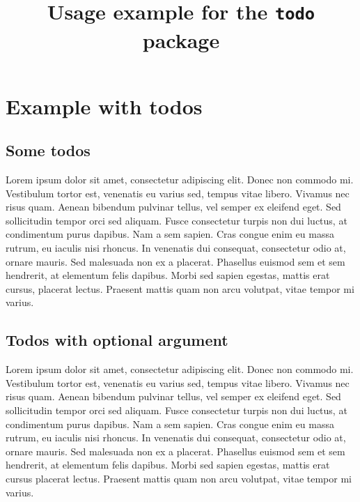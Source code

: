 \documentclass[11pt, a4paper, draft]{article} %
\title{Usage example for the \texttt{todo} package}
\author{}
\begin{document}
\maketitle
\tableofcontents
\listoftodo %


\section{Example with todos}

\subsection{Some todos}
Lorem ipsum dolor sit amet, consectetur adipiscing elit. 
Donec non commodo mi. %
Vestibulum tortor est, venenatis eu varius sed, tempus vitae libero.
Vivamus nec risus quam.
Aenean bibendum pulvinar tellus, vel semper ex eleifend eget.
Sed sollicitudin tempor orci sed aliquam.
Fusce consectetur turpis non dui luctus, at condimentum purus dapibus.
Nam a sem sapien.
Cras congue enim eu massa rutrum, eu iaculis nisi rhoncus.
In venenatis dui consequat, consectetur odio at, ornare mauris.
Sed malesuada non ex a placerat.
Phasellus euismod sem et sem hendrerit, at elementum felis dapibus. 
Morbi sed sapien egestas, mattis erat cursus, placerat lectus.                               %
Praesent mattis quam non arcu volutpat, vitae tempor mi varius.

\subsection{Todos with optional argument}
Lorem ipsum dolor sit amet, consectetur adipiscing elit. 
Donec non commodo mi. %
Vestibulum tortor est, venenatis eu varius sed, tempus vitae libero.
Vivamus nec risus quam.
Aenean bibendum pulvinar tellus, vel semper ex eleifend eget.
Sed sollicitudin tempor orci sed aliquam.
Fusce consectetur turpis non dui luctus, at condimentum purus dapibus.
Nam a sem sapien.
Cras congue enim eu massa rutrum, eu iaculis nisi rhoncus.
In venenatis dui consequat, consectetur odio at, ornare mauris.
Sed malesuada non ex a placerat.
Phasellus euismod sem et sem hendrerit, at elementum felis dapibus. 
Morbi sed sapien egestas, mattis erat cursus
placerat lectus.  %
Praesent mattis quam non arcu volutpat, vitae tempor mi varius.
\end{document}
